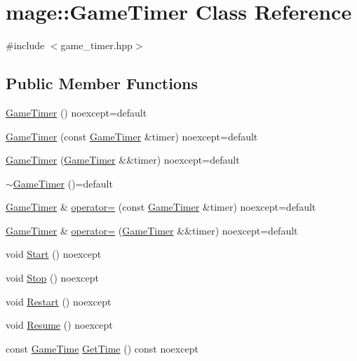 \hypertarget{classmage_1_1_game_timer}{}\section{mage\+:\+:Game\+Timer Class Reference}
\label{classmage_1_1_game_timer}


{\ttfamily \#include $<$game\+\_\+timer.\+hpp$>$}

\subsection*{Public Member Functions}
\begin{DoxyCompactItemize}
\item 
\mbox{\hyperlink{classmage_1_1_game_timer_a171e5e335b8c2ba77ce80b64bcad9ef5}{Game\+Timer}} () noexcept=default
\item 
\mbox{\hyperlink{classmage_1_1_game_timer_a0c70f8245381120b6e334db078affa00}{Game\+Timer}} (const \mbox{\hyperlink{classmage_1_1_game_timer}{Game\+Timer}} \&timer) noexcept=default
\item 
\mbox{\hyperlink{classmage_1_1_game_timer_a5be12a14c07e264f402635a87b78b401}{Game\+Timer}} (\mbox{\hyperlink{classmage_1_1_game_timer}{Game\+Timer}} \&\&timer) noexcept=default
\item 
\mbox{\hyperlink{classmage_1_1_game_timer_a1ba81ccdb247f932e7a396f1ce773bbd}{$\sim$\+Game\+Timer}} ()=default
\item 
\mbox{\hyperlink{classmage_1_1_game_timer}{Game\+Timer}} \& \mbox{\hyperlink{classmage_1_1_game_timer_a9465e2d38d8810c2acb2cde2aafeaad1}{operator=}} (const \mbox{\hyperlink{classmage_1_1_game_timer}{Game\+Timer}} \&timer) noexcept=default
\item 
\mbox{\hyperlink{classmage_1_1_game_timer}{Game\+Timer}} \& \mbox{\hyperlink{classmage_1_1_game_timer_ae5489a5363fbf69592270a9f35f269c9}{operator=}} (\mbox{\hyperlink{classmage_1_1_game_timer}{Game\+Timer}} \&\&timer) noexcept=default
\item 
void \mbox{\hyperlink{classmage_1_1_game_timer_ab4eb362f71e15e1ca931d5bd0102db46}{Start}} () noexcept
\item 
void \mbox{\hyperlink{classmage_1_1_game_timer_a309768cb7a9dee1f4ac358bdba1842f4}{Stop}} () noexcept
\item 
void \mbox{\hyperlink{classmage_1_1_game_timer_a93108b016f2034da39e576067443d265}{Restart}} () noexcept
\item 
void \mbox{\hyperlink{classmage_1_1_game_timer_adbc9ce04e6c7f53f0b5ea6b5ce79a288}{Resume}} () noexcept
\item 
const \mbox{\hyperlink{classmage_1_1_game_time}{Game\+Time}} \mbox{\hyperlink{classmage_1_1_game_timer_a5883ab785122b5722ec11045e146ff18}{Get\+Time}} () const noexcept
\end{DoxyCompactItemize}

